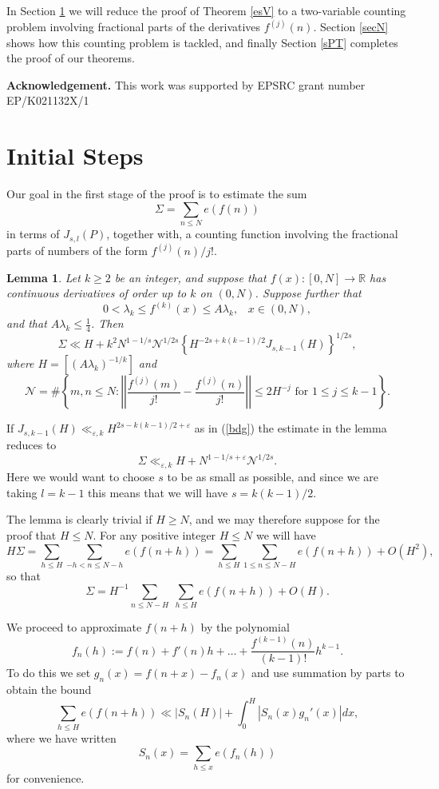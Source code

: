 \documentclass[a4paper,10pt]{article}
\newcommand{\R}{\mathbb{R}}
\newcommand{\ep}{\varepsilon}
\newcommand{\lk}{\lambda_k}
\newcommand{\beql}[1]{\begin{equation}\label{#1}}
\newcommand{\eeq}{\end{equation}}
\newtheorem{lemma}{Lemma}
\begin{document}
In Section \ref{sec2} we will reduce the proof of Theorem \ref{esV} 
to a two-variable
counting problem involving fractional parts of the derivatives $f^{(j)}(n)$.
Section \ref{secN} shows how this counting problem is tackled, and
finally Section \ref{sPT} completes the proof of our theorems.

{\bf Acknowledgement.}  This work was supported by EPSRC grant number
EP/K021132X/1



\section{Initial Steps}\label{sec2}

Our goal in the first stage of the proof is to estimate the sum
\[\Sigma=\sum_{n\le N}e(f(n))\]
in terms of $J_{s,l}(P)$, together with, a counting function involving
the fractional parts of numbers of the form $f^{(j)}(n)/j!$.
\begin{lemma}\label{l1}
Let $k\ge 2$ be an integer, and
suppose that $f(x):[0,N]\to\R$ has continuous
derivatives of order up to $k$ on $(0,N)$.  Suppose further that 
\[0<\lambda_k\le f^{(k)}(x)\le A\lambda_k,\;\;\; x\in (0,N), \]
and that $A\lk\le \tfrac14$.  Then
\[\Sigma\ll H+k^2 N^{1-1/s}\mathcal{N}^{1/2s}
\left\{H^{-2s+k(k-1)/2}J_{s,k-1}(H)\right\}^{1/2s},\]
where $H=[(A\lk)^{-1/k}]$ and
\[\mathcal{N}=\#\left\{m,n\le N:
\left|\left|\frac{f^{(j)}(m)}{j!}-\frac{f^{(j)}(n)}{j!}\right|\right|
\le 2H^{-j}\mbox{ for } 1\le j\le k-1\right\}.\]
\end{lemma}

If $J_{s,k-1}(H)\ll_{\ep,k} H^{2s-k(k-1)/2+\ep}$ as in (\ref{bdg})
the estimate in the lemma reduces to
\beql{basic}
\Sigma\ll_{\ep,k} H+N^{1-1/s+\ep}\mathcal{N}^{1/2s}.
\eeq
Here we would want to choose $s$ to be as small as possible, and since
we are taking $l=k-1$ this means that we will have $s=k(k-1)/2$.

The lemma is clearly trivial if $H\ge N$, and we may therefore suppose
for the proof that $H\le N$.
For any positive integer $H\le N$ we will have
\[H\Sigma=\sum_{h\le H}\sum_{-h<n\le N-h}e(f(n+h))=
\sum_{h\le H}\sum_{1\le n\le N-H}e(f(n+h))+O(H^2),\]
so that
\beql{Sigma1}
\Sigma=H^{-1}\sum_{n\le N-H}\;\sum_{h\le H}e(f(n+h))+O(H).
\eeq

We proceed to approximate $f(n+h)$ by the polynomial
\[f_n(h):=f(n)+f'(n)h+\ldots+\frac{f^{(k-1)}(n)}{(k-1)!}h^{k-1}.\]
To do this we set $g_n(x)=f(n+x)-f_n(x)$ and use summation by parts to
obtain the bound
\[\sum_{h\le H}e(f(n+h))\ll |S_n(H)|+\int_0^H |S_n(x)g_n'(x)|dx,\]
where we have written
\[S_n(x)=\sum_{h\le x}e(f_n(h))\]
for convenience.
\end{document}
